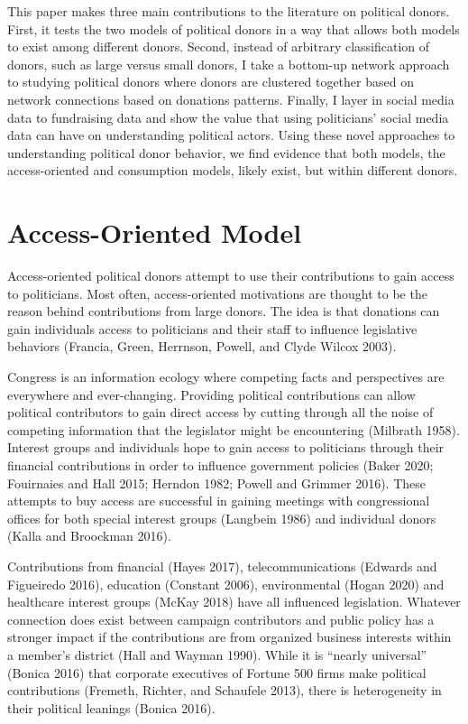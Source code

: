\documentclass[12pt,]{article}
\begin{document}
This paper makes three main contributions to the literature on political
donors. First, it tests the two models of political donors in a way that
allows both models to exist among different donors. Second, instead of
arbitrary classification of donors, such as large versus small donors, I
take a bottom-up network approach to studying political donors where
donors are clustered together based on network connections based on
donations patterns. Finally, I layer in social media data to fundraising
data and show the value that using politicians' social media data can
have on understanding political actors. Using these novel approaches to
understanding political donor behavior, we find evidence that both
models, the access-oriented and consumption models, likely exist, but
within different donors.

\hypertarget{access-oriented-model}{%
\section{Access-Oriented Model}\label{access-oriented-model}}

Access-oriented political donors attempt to use their contributions to
gain access to politicians. Most often, access-oriented motivations are
thought to be the reason behind contributions from large donors. The
idea is that donations can gain individuals access to politicians and
their staff to influence legislative behaviors (Francia, Green,
Herrnson, Powell, and Clyde Wilcox 2003).

Congress is an information ecology where competing facts and
perspectives are everywhere and ever-changing. Providing political
contributions can allow political contributors to gain direct access by
cutting through all the noise of competing information that the
legislator might be encountering (Milbrath 1958). Interest groups and
individuals hope to gain access to politicians through their financial
contributions in order to influence government policies (Baker 2020;
Fouirnaies and Hall 2015; Herndon 1982; Powell and Grimmer 2016). These
attempts to buy access are successful in gaining meetings with
congressional offices for both special interest groups (Langbein 1986)
and individual donors (Kalla and Broockman 2016).

Contributions from financial (Hayes 2017), telecommunications (Edwards
and Figueiredo 2016), education (Constant 2006), environmental (Hogan
2020) and healthcare interest groups (McKay 2018) have all influenced
legislation. Whatever connection does exist between campaign
contributors and public policy has a stronger impact if the
contributions are from organized business interests within a member's
district (Hall and Wayman 1990). While it is ``nearly universal''
(Bonica 2016) that corporate executives of Fortune 500 firms make
political contributions (Fremeth, Richter, and Schaufele 2013), there is
heterogeneity in their political leanings (Bonica 2016).
\end{document}
